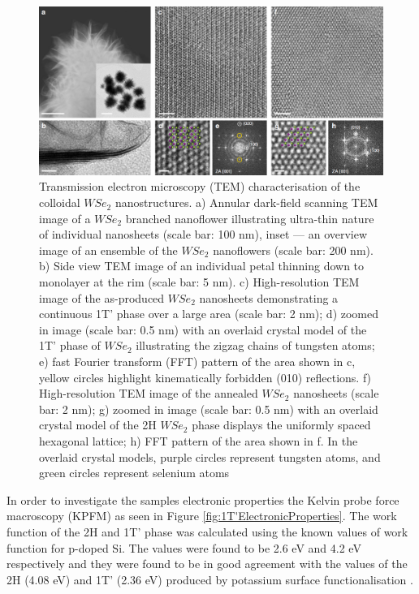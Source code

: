 \begin{figure}[H]
	\begin{center}
		\includegraphics[scale=0.3]{1T'/TEMMaps.png}
		\caption{Transmission electron microscopy (TEM) characterisation of the colloidal $WSe_2$ nanostructures. a) Annular dark-field scanning TEM image of a $WSe_2$ branched nanoflower illustrating ultra-thin nature of individual nanosheets (scale bar: 100 nm), inset — an overview image of an ensemble of the $WSe_2$ nanoflowers (scale bar: 200 nm). b) Side view TEM image of an individual petal thinning down to monolayer at the rim (scale bar: 5 nm). c) High-resolution TEM image of the as-produced $WSe_2$ nanosheets demonstrating a continuous 1T’ phase over a large area (scale bar: 2 nm); d) zoomed in image (scale bar:
0.5 nm) with an overlaid crystal model of the 1T’ phase of $WSe_2$ illustrating the zigzag chains of tungsten atoms; e) fast Fourier transform (FFT) pattern of the area shown in c, yellow circles highlight kinematically forbidden (010) reflections. f) High-resolution TEM image of the annealed $WSe_2$ nanosheets (scale bar: 2 nm); g) zoomed in image (scale bar: 0.5 nm) with an overlaid crystal model of the 2H $WSe_2$ phase displays the uniformly spaced hexagonal lattice; h) FFT pattern of the area shown in f. In the overlaid crystal models, purple circles represent tungsten atoms, and green circles represent selenium atoms}
		\label{fig:1T'TEMMaps}
	\end{center}
\end{figure}

In order to investigate the samples electronic properties the Kelvin probe force macroscopy (KPFM) as seen in Figure \ref{fig:1T'ElectronicProperties}. The work function of the 2H and 1T' phase was calculated using the known values of work function for p-doped Si. The values were found to be 2.6 eV and 4.2 eV respectively and they were found to be in good agreement with the values of the 2H (4.08 eV) and 1T' (2.36 eV) produced by potassium surface functionalisation \cite{Lei2018}. 

